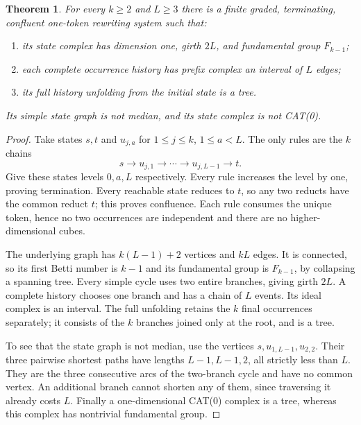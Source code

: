 \documentclass[11pt]{article}
\newtheorem{theorem}{Theorem}[section]
\theoremstyle{definition}
\numberwithin{equation}{section}
\begin{document}
\begin{theorem}\label{thm:free}
For every $k\ge2$ and $L\ge3$ there is a finite graded, terminating,
confluent one-token rewriting system such that:
\begin{enumerate}
\item its state complex has dimension one, girth $2L$, and
      fundamental group $F_{k-1}$;
\item each complete occurrence history has prefix complex an
      interval of $L$ edges;
\item its full history unfolding from the initial state is a tree.
\end{enumerate}
Its simple state graph is not median, and its state complex is not
CAT(0).
\end{theorem}
\begin{proof}
Take states $s,t$ and $u_{j,a}$ for $1\le j\le k$, $1\le a<L$.
The only rules are the $k$ chains
\begin{equation}\label{eq:chains}
 s\longrightarrow u_{j,1}\longrightarrow\cdots
       \longrightarrow u_{j,L-1}\longrightarrow t.
\end{equation}
Give these states levels $0,a,L$ respectively. Every rule increases
the level by one, proving termination. Every reachable state reduces
to $t$, so any two reducts have the common reduct $t$; this proves
confluence. Each rule consumes the unique token, hence no two
occurrences are independent and there are no higher-dimensional
cubes.

The underlying graph has $k(L-1)+2$ vertices and $kL$ edges.
It is connected, so its first Betti number is $k-1$ and its
fundamental group is $F_{k-1}$, by collapsing a spanning tree.
Every simple cycle uses two entire branches, giving girth $2L$.
A complete history chooses one branch and has a chain of $L$
events. Its ideal complex is an interval. The full unfolding retains
the $k$ final occurrences separately; it consists of the $k$
branches joined only at the root, and is a tree.

To see that the state graph is not median, use the vertices
$s,u_{1,L-1},u_{2,2}$. Their three pairwise shortest paths have
lengths $L-1,L-1,2$, all strictly less than $L$.
They are the three consecutive arcs of the two-branch cycle and
have no common vertex. An additional branch cannot shorten any
of them, since traversing it already costs $L$.
Finally a one-dimensional CAT(0) complex is a tree, whereas this
complex has nontrivial fundamental group.
\end{proof}
\end{document}
